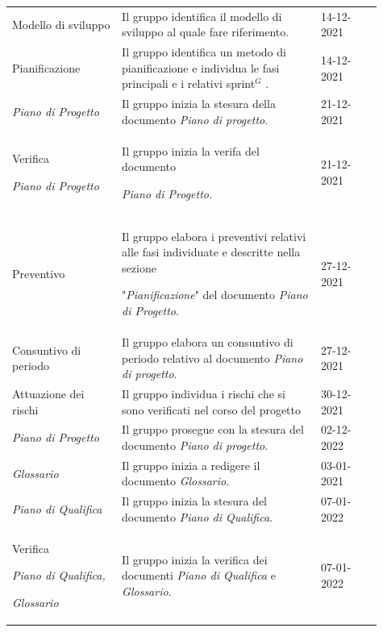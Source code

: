 {\begin{longtable}{p{0.27\linewidth}p{0.49\linewidth}p{0.15\linewidth}}
    \rowcolor[RGB]{216, 235, 171}
    Modello di sviluppo & Il gruppo identifica il modello di sviluppo al quale fare riferimento. & 14-12-2021\\

    \rowcolor[RGB]{233, 245, 206}
    Pianificazione & Il gruppo identifica un metodo di pianificazione e individua le fasi principali e i relativi sprint$^G$ . & 14-12-2021\\

    \rowcolor[RGB]{216, 235, 171}
    \textit{Piano di Progetto} & Il gruppo inizia la stesura della documento \textit{Piano di progetto}. & 21-12-2021\\

    \rowcolor[RGB]{233, 245, 206}
    Verifica \par \textit{Piano di Progetto} & Il gruppo inizia la verifa del documento \par \textit{Piano di Progetto}. & 21-12-2021\\

    \rowcolor[RGB]{216, 235, 171}
    Preventivo & Il gruppo elabora i preventivi relativi alle fasi individuate e descritte nella sezione \par "\textit{Pianificazione}" del documento \textit{Piano di Progetto}. & 27-12-2021\\

    \rowcolor[RGB]{233, 245, 206}
    Consuntivo di periodo & Il gruppo elabora un consuntivo di periodo relativo al documento \textit{Piano di progetto}. & 27-12-2021\\

    \rowcolor[RGB]{216, 235, 171}
    Attuazione dei rischi & Il gruppo individua i rischi che si sono verificati nel corso del progetto & 30-12-2021\\

    \rowcolor[RGB]{233, 245, 206}
    \textit{Piano di Progetto} & Il gruppo prosegue con la stesura del documento \textit{Piano di progetto}. & 02-12-2022\\
    
    \rowcolor[RGB]{216, 235, 171}
    \textit{Glossario} & Il gruppo inizia a redigere il documento \textit{Glossario}. & 03-01-2021\\

    \rowcolor[RGB]{233, 245, 206}
    \textit{Piano di Qualifica} & Il gruppo inizia la stesura del documento \textit{Piano di Qualifica}. & 07-01-2022\\

    \rowcolor[RGB]{216, 235, 171}
    Verifica \par \textit{Piano di Qualifica,} \par \textit{Glossario} & Il gruppo inizia la verifica dei documenti \textit{Piano di Qualifica} e \textit{Glossario}. & 07-01-2022\\


\end{longtable}}
